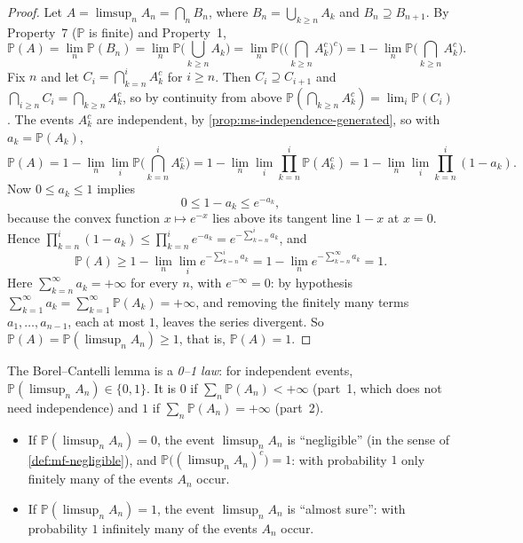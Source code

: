 \begin{proof}
Let $A=\limsup_nA_n=\bigcap_nB_n$, where $B_n=\bigcup_{k\ge n}A_k$ and $B_n\supseteq B_{n+1}$.
By Property~7 ($\mathbb P$ is finite) and Property~1,
\[
  \mathbb P(A)=\lim_n\mathbb P(B_n)=\lim_n\mathbb P\Big(\bigcup_{k\ge n}A_k\Big)
  =\lim_n\mathbb P\Big(\Big(\bigcap_{k\ge n}A_k^c\Big)^c\Big)
  =1-\lim_n\mathbb P\Big(\bigcap_{k\ge n}A_k^c\Big).
\]
Fix $n$ and let $C_i=\bigcap_{k=n}^iA_k^c$ for $i\ge n$. Then $C_i\supseteq C_{i+1}$ and
$\bigcap_{i\ge n}C_i=\bigcap_{k\ge n}A_k^c$, so by continuity from above
$\mathbb P(\bigcap_{k\ge n}A_k^c)=\lim_i\mathbb P(C_i)$. The events $A_k^c$ are independent,
by \cref{prop:ms-independence-generated}, so with $a_k=\mathbb P(A_k)$,
\[
  \mathbb P(A)=1-\lim_n\lim_i\mathbb P\Big(\bigcap_{k=n}^iA_k^c\Big)
  =1-\lim_n\lim_i\prod_{k=n}^i\mathbb P(A_k^c)
  =1-\lim_n\lim_i\prod_{k=n}^i(1-a_k).
\]
Now $0\le a_k\le1$ implies
\begin{equation}\label{eq:ms-exp-bound}
  0\le1-a_k\le e^{-a_k},
\end{equation}
because the convex function $x\mapsto e^{-x}$ lies above its tangent line $1-x$ at $x=0$.
Hence $\prod_{k=n}^i(1-a_k)\le\prod_{k=n}^ie^{-a_k}=e^{-\sum_{k=n}^ia_k}$, and
\[
  \mathbb P(A)\ge1-\lim_n\lim_ie^{-\sum_{k=n}^ia_k}=1-\lim_ne^{-\sum_{k=n}^\infty a_k}=1 .
\]
Here $\sum_{k=n}^\infty a_k=+\infty$ for every $n$, with $e^{-\infty}=0$: by hypothesis
$\sum_{k=1}^\infty a_k=\sum_{k=1}^\infty\mathbb P(A_k)=+\infty$, and removing the finitely many
terms $a_1,\dots,a_{n-1}$, each at most $1$, leaves the series divergent. So
$\mathbb P(A)=\mathbb P(\limsup_nA_n)\ge1$, that is, $\mathbb P(A)=1$.
\end{proof}

\begin{remark}[A 0--1 law]\label{rem:ms-zero-one}
The Borel--Cantelli lemma is a \emph{0--1 law}: for independent events,
$\mathbb P(\limsup_nA_n)\in\{0,1\}$. It is $0$ if $\sum_n\mathbb P(A_n)<+\infty$ (part~1, which
does not need independence) and $1$ if $\sum_n\mathbb P(A_n)=+\infty$ (part~2).
\begin{itemize}
  \item If $\mathbb P(\limsup_nA_n)=0$, the event $\limsup_nA_n$ is ``negligible'' (in the
    sense of \cref{def:mf-negligible}), and $\mathbb P\big((\limsup_nA_n)^c\big)=1$: with
    probability $1$ only finitely many of the events $A_n$ occur.
  \item If $\mathbb P(\limsup_nA_n)=1$, the event $\limsup_nA_n$ is ``almost sure'': with
    probability $1$ infinitely many of the events $A_n$ occur.
\end{itemize}
\end{remark}


